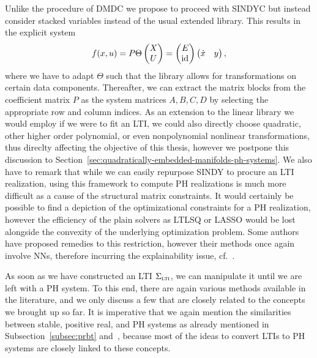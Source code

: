 Unlike the procedure of \ac{DMDC} we propose to proceed with \ac{SINDYC} but instead consider stacked variables instead of the usual extended library.
This results in the explicit system
\begin{equation}\label{eq:sindy-io}
    f(x, u) = P \Theta \begin{pmatrix}
        X \\
        U
    \end{pmatrix} = \begin{pmatrix}
        E \\
        \text{id}_{}
    \end{pmatrix} \begin{pmatrix}
        \dot{x} & y
    \end{pmatrix},
\end{equation}
where we have to adapt $\Theta$ such that the library allows for transformations on certain data components.
Thereafter, we can extract the matrix blocks from the coefficient matrix $P$ as the system matrices $A, B, C, D$ by selecting the appropriate row and column indices.
As an extension to the linear library we would employ if we were to fit an \ac{LTI}, we could also directly choose quadratic, other higher order polynomial, or even nonpolynomial nonlinear transformations, thus direclty affecting the objective of this thesis, however we postpone this discussion to Section~\ref{sec:quadratically-embedded-manifolds-ph-systems}.
We also have to remark that while we can easily repurpose \ac{SINDY} to procure an \ac{LTI} realization, using this framework to compute \ac{PH} realizations is much more difficult as a cause of the structural matrix constraints.
It would certainly be possible to find a depiction of the optimizational constraints for a \ac{PH} realization, however the efficiency of the plain solvers as LTLSQ or LASSO would be lost alongside the convexity of the underlying optimization problem.
Some authors have proposed remedies to this restriction, however their methods once again involve \acp{NN}, therefore incurring the explainability issue, cf.~\cite{Lee2022}.



As soon as we have constructed an \ac{LTI} $\Sigma_{\textnormal{\scshape lti}}$, we can manipulate it until we are left with a \ac{PH} system.
To this end, there are again various methods available in the literature, and we only discuss a few that are closely related to the concepts we brought up so far.
It is imperative that we again mention the similarities between stable, positive real, and \ac{PH} systems as already mentioned in Subsection~\ref{subsec:prbt} and~\cite{Cherifi2022}, because most of the ideas to convert \acp{LTI} to \ac{PH} systems are closely linked to these concepts.

